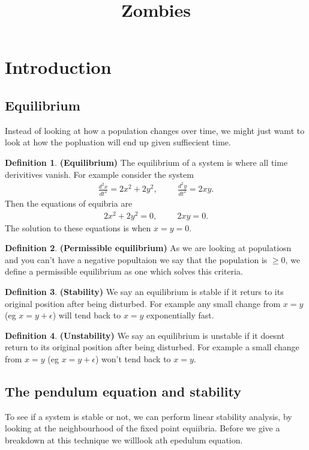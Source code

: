 \documentclass{mm2}
\title{Zombies}
\numberwithin{equation}{section}
\theoremstyle{definition}
\newtheorem{definition}{Definition}[section]
\begin{document}
	\newpage
	\tableofcontents
	\newpage
\section{Introduction}
\subsection{Equilibrium}
Instead of looking at how a population changes over time, we might just wamt to look at how the popluation will end up given suffiecient time. \newline
\begin{definition}{\textbf{(Equilibrium)}} The equilibrium of a system is where all time derivitives vanish. For example consider the system
	\begin{eqnarray}
	\frac{d^2x}{dt^2} = 2x^2 + 2y^2, \hspace{1cm} \frac{d^2y}{dt^2} = 2xy.
	\end{eqnarray} 
	Then the equations of equibria are 
	\begin{eqnarray}
	2x^2 + 2y^2= 0, \hspace{1cm} 2xy= 0.
	\end{eqnarray}
	The solution to these equations is when $x=y=0$.
\end{definition}
\begin{definition}{\textbf{(Permissible equilibrium)}} As we are looking at populatiosn and you can't have a negative popultaion we say that the population is $\geq 0$, we define a permissible equilibrium as one which solves this criteria.
\end{definition}
\begin{definition}{\textbf{(Stability)}} We say an equilibrium is stable if it returs to its original position after being disturbed. For example any small change from $x=y$ (eg $x = y + \epsilon$) will tend back to $x=y$ exponentially fast.
\end{definition}
\begin{definition}{\textbf{(Unstability)}} We say an equilibrium is unstable if it doesnt return to its original position after being disturbed. For example a small change from $x=y$ (eg $x = y + \epsilon$) won't tend back to $x=y$.
\end{definition}
\subsection{The pendulum equation and stability}
To see if a system is stable or not, we can perform linear stability analysis, by looking at the neighbourhood of the fixed point equiibria. Before we give a breakdown at this technique we willlook ath epedulum equation.
\end{document}

